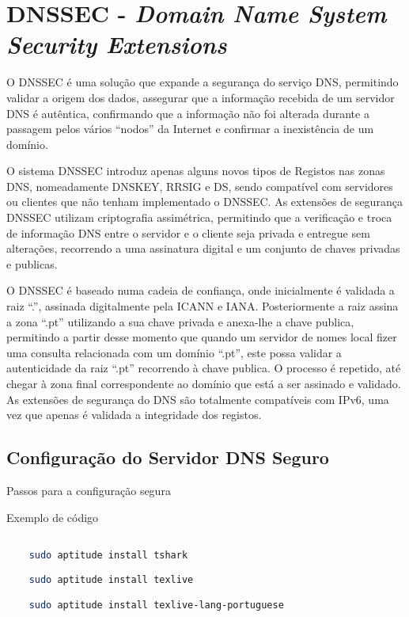 \documentclass[a4paper]{report} %
\begin{document}
\chapter{ DNSSEC  - \textit{Domain Name System Security Extensions}}
\label{chap_dnssec}

O DNSSEC é uma solução que expande a segurança do serviço DNS, permitindo validar a origem dos dados, assegurar que a informação recebida de um servidor DNS é autêntica, confirmando que a informação não foi alterada durante a passagem pelos vários “nodos” da Internet e confirmar a inexistência de um domínio.

O sistema DNSSEC introduz apenas alguns novos tipos de Registos nas zonas DNS, nomeadamente DNSKEY, RRSIG e DS, sendo compatível com servidores ou clientes que não tenham implementado o DNSSEC. As extensões de segurança DNSSEC utilizam criptografia assimétrica, permitindo que a verificação e troca de informação DNS entre o servidor e o cliente seja privada e entregue sem alterações, recorrendo a uma assinatura digital e um conjunto de chaves privadas e publicas.

O DNSSEC é baseado numa cadeia de confiança, onde inicialmente é validada a raiz “.”, assinada digitalmente pela ICANN e IANA. Posteriormente a raiz assina a zona “.pt” utilizando a sua chave privada e anexa-lhe a chave publica, permitindo a partir desse momento que quando um servidor de nomes local fizer uma consulta relacionada com um domínio “.pt”, este possa validar a autenticidade da raiz “.pt” recorrendo à chave publica. O processo é repetido, até chegar à zona final correspondente ao domínio que está a ser assinado e validado. As extensões de segurança do DNS são totalmente compatíveis com IPv6, uma vez que apenas é validada a integridade dos registos.

\section{Configuração do Servidor DNS Seguro}
\label{sec_config_segura}

Passos para a configuração segura

Exemplo de código
\begin{lstlisting}[language=bash]

	sudo aptitude install tshark

	sudo aptitude install texlive

	sudo aptitude install texlive-lang-portuguese

\end{lstlisting}
\end{document}

